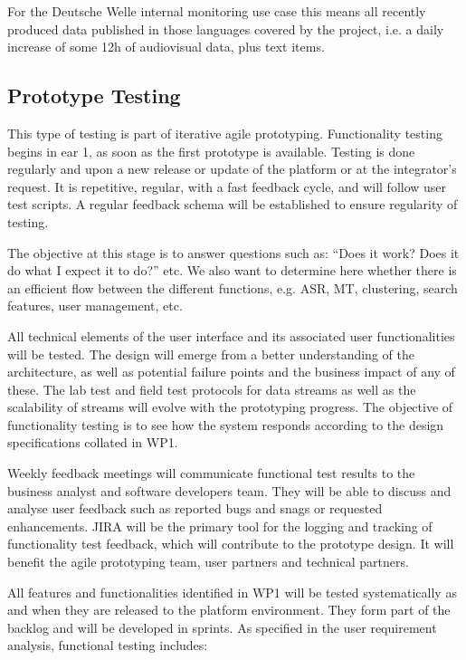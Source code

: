 For the Deutsche Welle internal monitoring use case this means all recently produced data published in those languages covered by the project, i.e. a daily increase of some 12h of audiovisual data, plus text items.

\subsection{Prototype Testing}

This type of testing is part of iterative agile prototyping. Functionality testing begins in ear 1, as soon as the first prototype is available. Testing is done regularly and upon a new release or update of the platform or at the integrator’s request. It is repetitive, regular, with a fast feedback cycle, and will follow user test scripts. A regular feedback schema will be established to ensure regularity of testing.

The objective at this stage is to answer questions such as: “Does it work? Does it do what I expect it to do?” etc. We also want to determine here whether there is an efficient flow between the different functions, e.g. ASR, MT, clustering, search features, user management, etc.

All technical elements of the user interface and its associated user functionalities will be tested. The design will emerge from
a better understanding of the architecture, as well as potential failure points and the business impact of any of these. The
lab test and field test protocols for data streams as well as the scalability of streams will evolve with the prototyping
progress. The objective of functionality testing is to see how the system responds according to the design specifications collated in WP1.

Weekly feedback meetings will communicate functional test results to the business analyst and software developers team. They will be able to discuss and analyse user feedback such as reported bugs and snags or requested enhancements. JIRA will be the primary tool for the logging and tracking of functionality test feedback, which will contribute to the prototype design. It will benefit the agile prototyping team, user partners and technical partners.

All features and functionalities identified in WP1 will be tested systematically as and when they are released to the platform environment. They form part of the backlog and will be developed in sprints. As specified in the user requirement analysis, functional testing includes:

